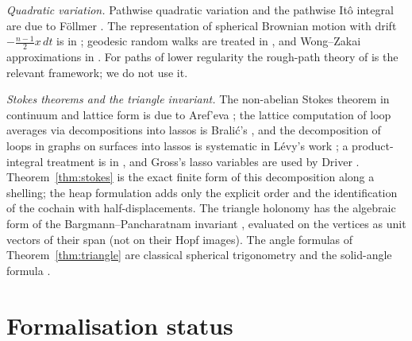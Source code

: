 \documentclass[11pt,reqno]{amsart}
\theoremstyle{definition}
\theoremstyle{remark}
\numberwithin{equation}{section}
\begin{document}
\emph{Quadratic variation.}  Pathwise quadratic variation and the pathwise It\^o integral are due to F\"ollmer
\cite{Follmer}.  The representation of spherical Brownian motion with drift $-\tfrac{n-1}2x\,dt$ is in
\cite{Stroock,Hsu}; geodesic random walks are treated in \cite{Jorgensen}, and Wong--Zakai approximations in
\cite{WZ,IW}.  For paths of lower regularity the rough-path theory of \cite{Lyons} is the relevant framework; we
do not use it.

\emph{Stokes theorems and the triangle invariant.}  The non-abelian Stokes theorem in continuum and lattice form is
due to Aref'eva \cite{Arefeva}; the lattice computation of loop averages via decompositions into lassos is Bralić's
\cite{Bralic80}, and the decomposition of loops in graphs on surfaces into lassos is systematic in L\'evy's work
\cite{Levy03,Levy10}; a product-integral treatment is in \cite{KMR}, and Gross's lasso variables are used by Driver
\cite{Driver89}.  Theorem~\ref{thm:stokes} is the exact finite form of this decomposition along a shelling; the heap
formulation adds only the explicit order and the identification of the cochain with half-displacements.  The triangle
holonomy has the algebraic form of the Bargmann--Pancharatnam invariant \cite{SB88,MS93}, evaluated on the vertices as unit vectors of
their span (not on their Hopf images).  The angle formulas of
Theorem~\ref{thm:triangle} are classical spherical trigonometry \cite{Todhunter} and the solid-angle formula
\cite{VOS,Eriksson}.

\section{Formalisation status}\label{sec:lean}
\end{document}
